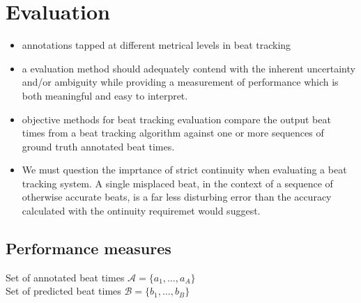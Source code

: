\documentclass{scrartcl}
\begin{document}










\newpage
\section{Evaluation}


\begin{itemize}
\item annotations tapped at different metrical levels in beat tracking
\item a evaluation method should adequately contend with the inherent uncertainty and/or ambiguity while providing a measurement of performance which is both meaningful and easy to interpret. \cite{Davies2009b}
\item objective methods for beat tracking evaluation compare the output beat times from a beat tracking algorithm against one or more sequences of ground truth annotated beat times. \cite{Davies2009b}
\item We must question the imprtance of strict continuity when evaluating a beat tracking system. A single misplaced beat, in the context of a sequence of otherwise accurate beats, is a far less disturbing error than the accuracy calculated with the ontinuity requiremet would suggest. 
\end{itemize}


\subsection{Performance measures}

Set of annotated beat times $\mathcal A = \{a_1, \dots, a_A\}$ \\
Set of predicted beat times $\mathcal B = \{b_1, \dots, b_B\}$ \\
\end{document}
